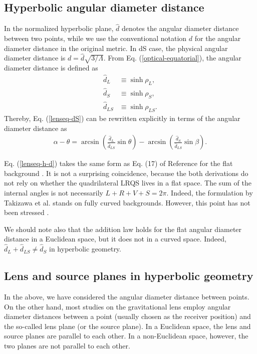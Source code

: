\documentclass[twocolumn,showpacs,preprintnumbers,amsmath,amssymb]{revtex4-1}
\begin{document}
\subsection{Hyperbolic angular diameter distance}
In the normalized hyperbolic plane, 
$\hat d$ denotes the angular diameter distance 
between two points, 
while we use the conventional notation $d$ for 
the angular diameter distance in the original metric. 
In dS case, the physical angular diameter distance is 
$d = \hat d \sqrt{3/\Lambda}$. 
From Eq. (\ref{optical-equatorial}), 
the angular diameter distance is defined as 
\begin{align}
\hat d_L 
&\equiv \sinh\rho_L , 
\label{dL-h}
\\
\hat d_S 
&\equiv \sinh\rho_S , 
\label{dS-h}
\\
\hat d_{LS} 
&\equiv \sinh\rho_{LS} . 
\label{dLS-h}
\end{align}
Thereby, Eq. (\ref{lenseq-dS}) can be rewritten explicitly 
in terms of the angular diameter distance as 
\begin{align}
\alpha - \theta 
= 
\arcsin\left(\frac{\hat d_L}{\hat d_{LS}}\sin\theta\right)
- \arcsin\left(\frac{\hat d_S}{\hat d_{LS}}\sin\beta\right) . 
\label{lenseq-h-d}
\end{align}

Eq. (\ref{lenseq-h-d}) takes the same form as 
Eq. (17) of Reference \cite{Takizawa2020b} 
for the flat background 
\cite{footnote-3}. 
It is not a surprising coincidence, 
because the both derivations do not rely 
on whether the quadrilateral LRQS lives in a flat space. 
The sum of the internal angles is not necessarily 
$L+R+V+S = 2\pi$. 
Indeed, the formulation by Takizawa et al. 
\cite{Takizawa2020b} stands on fully curved backgrounds. 
However, this point has not been stressed 
\cite{Takizawa2020b}. 

We should note also that the addition law holds 
for the flat angular diameter distance 
in a Euclidean space, 
but it does not in a curved space. 
Indeed, $\hat d_L + \hat d_{LS} \neq \hat d_S$ in hyperbolic geometry. 


\subsection{Lens and source planes in hyperbolic geometry}
In the above, we have considered the angular diameter distance between points. 
On the other hand, most studies on the gravitational lens employ 
angular diameter distances between a point (usually chosen as the receiver position) 
and the so-called lens plane (or the source plane). 
In a Euclidean space, 
the lens and source planes are parallel to each other. 
In a non-Euclidean space, however, the two planes are not parallel to each other. 
\end{document}
